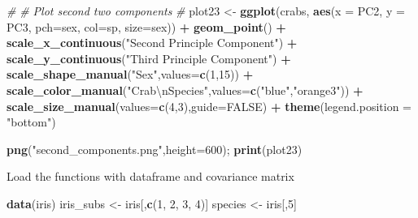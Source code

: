 \documentclass[11pt,]{article}
\newenvironment{Shaded}{\begin{snugshade}}{\end{snugshade}}
\newcommand{\CharTok}[1]{\textcolor[rgb]{0.31,0.60,0.02}{#1}}
\newcommand{\CommentTok}[1]{\textcolor[rgb]{0.56,0.35,0.01}{\textit{#1}}}
\newcommand{\DataTypeTok}[1]{\textcolor[rgb]{0.13,0.29,0.53}{#1}}
\newcommand{\DecValTok}[1]{\textcolor[rgb]{0.00,0.00,0.81}{#1}}
\newcommand{\KeywordTok}[1]{\textcolor[rgb]{0.13,0.29,0.53}{\textbf{#1}}}
\newcommand{\NormalTok}[1]{#1}
\newcommand{\OperatorTok}[1]{\textcolor[rgb]{0.81,0.36,0.00}{\textbf{#1}}}
\newcommand{\OtherTok}[1]{\textcolor[rgb]{0.56,0.35,0.01}{#1}}
\newcommand{\StringTok}[1]{\textcolor[rgb]{0.31,0.60,0.02}{#1}}
\begin{document}
\begin{Shaded}
\begin{Highlighting}[]
\CommentTok{#}
\CommentTok{# Plot second two components}
\CommentTok{#}
\NormalTok{plot23 <-}\StringTok{ }\KeywordTok{ggplot}\NormalTok{(crabs, }\KeywordTok{aes}\NormalTok{(}\DataTypeTok{x =}\NormalTok{ PC2, }\DataTypeTok{y =}\NormalTok{ PC3, }\DataTypeTok{pch=}\NormalTok{sex, }\DataTypeTok{col=}\NormalTok{sp, }\DataTypeTok{size=}\NormalTok{sex)) }\OperatorTok{+}
\StringTok{        }\KeywordTok{geom_point}\NormalTok{()                                                    }\OperatorTok{+}
\StringTok{        }\KeywordTok{scale_x_continuous}\NormalTok{(}\StringTok{"Second Principle Component"}\NormalTok{)                }\OperatorTok{+}
\StringTok{        }\KeywordTok{scale_y_continuous}\NormalTok{(}\StringTok{"Third Principle Component"}\NormalTok{)                 }\OperatorTok{+}
\StringTok{        }\KeywordTok{scale_shape_manual}\NormalTok{(}\StringTok{"Sex"}\NormalTok{,}\DataTypeTok{values=}\KeywordTok{c}\NormalTok{(}\DecValTok{1}\NormalTok{,}\DecValTok{15}\NormalTok{))                        }\OperatorTok{+}
\StringTok{        }\KeywordTok{scale_color_manual}\NormalTok{(}\StringTok{"Crab}\CharTok{\textbackslash{}n}\StringTok{Species"}\NormalTok{,}\DataTypeTok{values=}\KeywordTok{c}\NormalTok{(}\StringTok{"blue"}\NormalTok{,}\StringTok{"orange3"}\NormalTok{))  }\OperatorTok{+}
\StringTok{        }\KeywordTok{scale_size_manual}\NormalTok{(}\DataTypeTok{values=}\KeywordTok{c}\NormalTok{(}\DecValTok{4}\NormalTok{,}\DecValTok{3}\NormalTok{),}\DataTypeTok{guide=}\OtherTok{FALSE}\NormalTok{)                    }\OperatorTok{+}
\StringTok{        }\KeywordTok{theme}\NormalTok{(}\DataTypeTok{legend.position =} \StringTok{"bottom"}\NormalTok{)}

\KeywordTok{png}\NormalTok{(}\StringTok{"second_components.png"}\NormalTok{,}\DataTypeTok{height=}\DecValTok{600}\NormalTok{); }\KeywordTok{print}\NormalTok{(plot23)}
\end{Highlighting}
\end{Shaded}

Load the functions with dataframe and covariance matrix

\begin{Shaded}
\begin{Highlighting}[]
\KeywordTok{data}\NormalTok{(iris)}
\NormalTok{iris_subs <-}\StringTok{ }\NormalTok{iris[,}\KeywordTok{c}\NormalTok{(}\DecValTok{1}\NormalTok{, }\DecValTok{2}\NormalTok{, }\DecValTok{3}\NormalTok{, }\DecValTok{4}\NormalTok{)]}
\NormalTok{species <-}\StringTok{ }\NormalTok{iris[,}\DecValTok{5}\NormalTok{]}
\end{Highlighting}
\end{Shaded}
\end{document}

